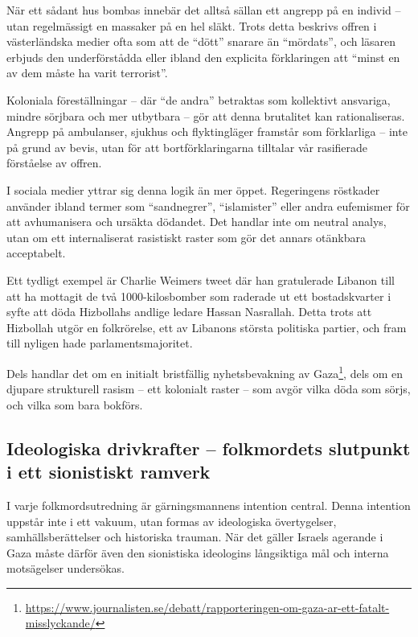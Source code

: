 När ett sådant hus bombas innebär det alltså sällan ett angrepp på en individ – utan regelmässigt en massaker på en hel släkt. Trots detta beskrivs offren i västerländska medier ofta som att de \enquote{dött} snarare än \enquote{mördats}, och läsaren erbjuds den underförstådda eller ibland den explicita förklaringen att \enquote{minst en av dem måste ha varit terrorist}.

Koloniala föreställningar – där \enquote{de andra} betraktas som kollektivt ansvariga, mindre sörjbara och mer utbytbara – gör att denna brutalitet kan rationaliseras. Angrepp på ambulanser, sjukhus och flyktingläger framstår som förklarliga – inte på grund av bevis, utan för att bortförklaringarna tilltalar vår rasifierade förståelse av offren.

I sociala medier yttrar sig denna logik än mer öppet. Regeringens röstkader använder ibland termer som \enquote{sandnegrer}, \enquote{islamister} eller andra eufemismer för att avhumanisera och ursäkta dödandet. Det handlar inte om neutral analys, utan om ett internaliserat rasistiskt raster som gör det annars otänkbara acceptabelt.

Ett tydligt exempel är Charlie Weimers tweet där han gratulerade Libanon till att ha mottagit de två 1000-kilosbomber som raderade ut ett bostadskvarter i syfte att döda Hizbollahs andlige ledare Hassan Nasrallah. Detta trots att Hizbollah utgör en folkrörelse, ett av Libanons största politiska partier, och fram till nyligen hade parlamentsmajoritet.

Dels handlar det om en initialt bristfällig nyhetsbevakning av Gaza\footnote{\url{https://www.journalisten.se/debatt/rapporteringen-om-gaza-ar-ett-fatalt-misslyckande/}}, dels om en djupare strukturell rasism – ett kolonialt raster – som avgör vilka döda som sörjs, och vilka som bara bokförs.

\subsection{Ideologiska drivkrafter – folkmordets slutpunkt i ett sionistiskt ramverk}

I varje folkmordsutredning är gärningsmannens intention central. Denna intention uppstår inte i ett vakuum, utan formas av ideologiska övertygelser, samhällsberättelser och historiska trauman. När det gäller Israels agerande i Gaza måste därför även den sionistiska ideologins långsiktiga mål och interna motsägelser undersökas.

